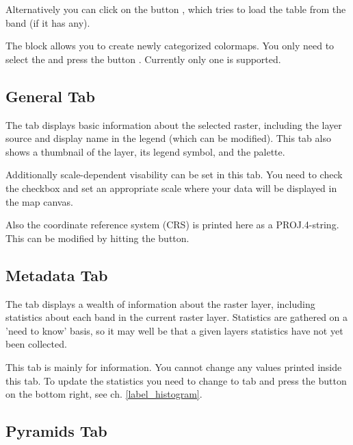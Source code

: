 Alternatively you can click on the button
, which tries to load the table from the band (if it has any).

The block  allows you to create newly
categorized colormaps. You only need to select the  and press the button . Currently
only one  is
supported.

\subsection{General Tab}\label{label_generaltab}

The  tab displays basic information about the selected raster,
including the layer source and  display name in the legend (which can be
modified). This tab also shows a thumbnail of the layer, its legend symbol,
and the palette.

Additionally scale-dependent visability can be set in this tab. You need to
check the checkbox and set an appropriate scale where your data will be
displayed in the map canvas.

Also the coordinate reference system (CRS) is printed here as a PROJ.4-string.
This can be modified by hitting the  button.

\subsection{Metadata Tab}\label{label_metatab}

The  tab displays a wealth of information about the raster layer,
including statistics about each band in the current raster layer. Statistics
are gathered on a 'need to know' basis, so it may well be that a given layers
statistics have not yet been collected.

This tab is mainly for information. You cannot change any values printed
inside this tab. To update the statistics you need to change to tab
 and press the button  on the bottom right,
see ch. \ref{label_histogram}.

\subsection{Pyramids Tab}\label{raster_pyramids}

